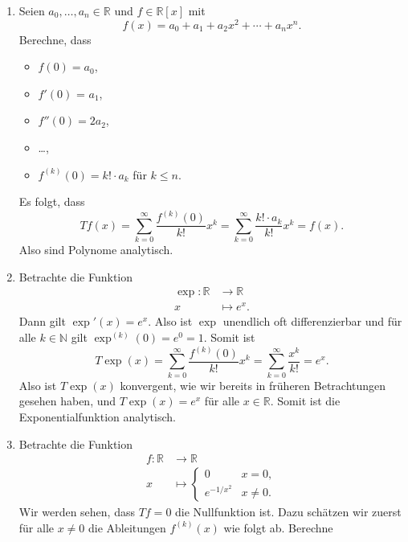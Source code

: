 \documentclass[../main.tex]{subfiles}
\begin{document}
\begin{examples}
  \leavevmode
  \begin{enumerate}[(1)]
    \item Seien $a_0, \dots, a_n \in \mathbb{R}$ und
      $f \in \mathbb{R}[x]$ mit
      \[
        f(x) = a_0 + a_1 + a_2 x^2 + \cdots +a_n x^{n}.
      \]
      Berechne, dass
      \begin{itemize}
        \item $f(0) = a_0$,
        \item $f'(0)$ = $a_1$,
        \item $f''(0) = 2a_2$,
        \item \dots,
        \item $f^{(k)}(0) = k! \cdot a_k$ für $k \leq n$.
      \end{itemize}
      Es folgt, dass
      \[
        Tf(x) = \sum_{k=0}^{\infty} \frac{f^{(k)}(0)}{k!}x^k
        = \sum_{k=0}^{\infty} \frac{k! \cdot a_k}{k!}x^k = f(x).
      \]
      Also sind Polynome analytisch.
    \item Betrachte die Funktion
      \begin{align*}
        \exp \colon \mathbb{R} & \to \mathbb{R} \\
        x & \mapsto e^x.
      \end{align*}
      Dann gilt $\exp'(x) = e^x$. Also ist $\exp$ unendlich oft differenzierbar
      und für alle $k \in \mathbb{N}$ gilt $\exp^{(k)}(0) = e^0 = 1$.
      Somit ist
      \[
        T\exp(x) = \sum_{k=0}^{\infty} \frac{f^{(k)}(0)}{k!}x^k
        = \sum_{k=0}^{\infty} \frac{x^k}{k!} = e^x.
      \]
      Also ist $T\exp(x)$ konvergent, wie wir bereits in früheren Betrachtungen
      gesehen haben, und $T\exp(x) = e^x$ für alle $x \in \mathbb{R}$.
      Somit ist die Exponentialfunktion analytisch.
    \item Betrachte die Funktion
      \begin{align*}
        f \colon \mathbb{R} & \to \mathbb{R} \\
        x & \mapsto 
        \begin{cases}
          0 & x = 0,\\
          e^{-1/x^2} & x \neq 0.
        \end{cases}
      \end{align*}
      Wir werden sehen, dass $Tf = 0$ die Nullfunktion ist.
      Dazu schätzen wir zuerst für alle $x \neq 0$ die Ableitungen
      $f^{(k)}(x)$ wie folgt ab. Berechne
      \begin{itemize}

\end{itemize}
\end{enumerate}
\end{examples}
\end{document}

